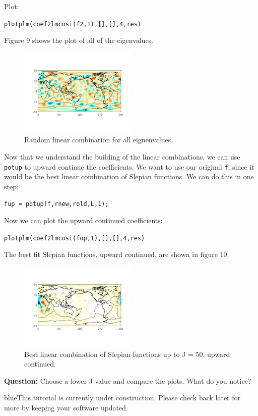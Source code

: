 \documentclass[11pt]{article}
\newcommand{\TAG}{\begin{color}{blue}This tutorial is currently under construction. Please check back later for more by keeping your software updated.\end{color}}
\begin{document}
Plot:

\verb|plotplm(coef2lmcosi(f2,1),[],[],4,res)|

Figure 9 shows the plot of all of the eigenvalues.

\begin{figure}[H]
	\centering
	\includegraphics[width=0.5\textwidth]{figures/f2ml.png}
	\caption{Random linear combination for all eignenvalues.}
\end{figure}


Now that we understand the building of the linear combinations, we can use \verb|potup| to upward continue the coefficients.  We want to use our original \verb|f|, since it would be the best linear combination of Slepian functions.  We can do this in one step:

\verb|fup = potup(f,rnew,rold,L,1);|

Now we can plot the upward continued coefficients:

\verb|plotplm(coef2lmcosi(fup,1),[],[],4,res)|

The best fit Slepian functions, upward continued, are shown in figure 10.

\begin{figure}[H]
	\centering
	\includegraphics[width=0.5\textwidth]{figures/fup_ml.png}
	\caption{Best linear combination of Slepian functions up to J = 50, upward continued.}
\end{figure}

\textbf{Question:} Choose a lower J value and compare the plots.  What do you notice?


\TAG
\end{document}
